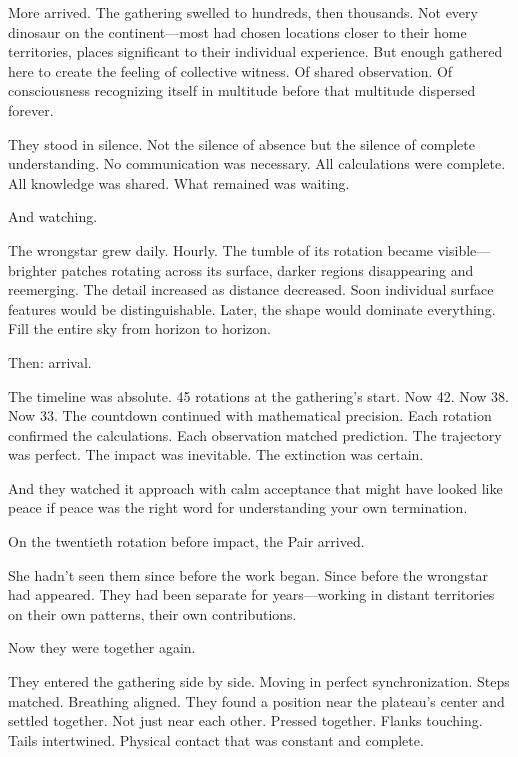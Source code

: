 \scenebreak

More arrived. The gathering swelled to hundreds, then thousands. Not every dinosaur on the continent—most had chosen locations closer to their home territories, places significant to their individual experience. But enough gathered here to create the feeling of collective witness. Of shared observation. Of consciousness recognizing itself in multitude before that multitude dispersed forever.

They stood in silence. Not the silence of absence but the silence of complete understanding. No communication was necessary. All calculations were complete. All knowledge was shared. What remained was waiting.

And watching.

The wrongstar grew daily. Hourly. The tumble of its rotation became visible—brighter patches rotating across its surface, darker regions disappearing and reemerging. The detail increased as distance decreased. Soon individual surface features would be distinguishable. Later, the shape would dominate everything. Fill the entire sky from horizon to horizon.

Then: arrival.

The timeline was absolute. 45 rotations at the gathering's start. Now 42. Now 38. Now 33. The countdown continued with mathematical precision. Each rotation confirmed the calculations. Each observation matched prediction. The trajectory was perfect. The impact was inevitable. The extinction was certain.

And they watched it approach with calm acceptance that might have looked like peace if peace was the right word for understanding your own termination.

\scenebreak

On the twentieth rotation before impact, the Pair arrived.

She hadn't seen them since before the work began. Since before the wrongstar had appeared. They had been separate for years—working in distant territories on their own patterns, their own contributions.

Now they were together again.

They entered the gathering side by side. Moving in perfect synchronization. Steps matched. Breathing aligned. They found a position near the plateau's center and settled together. Not just near each other. Pressed together. Flanks touching. Tails intertwined. Physical contact that was constant and complete.

